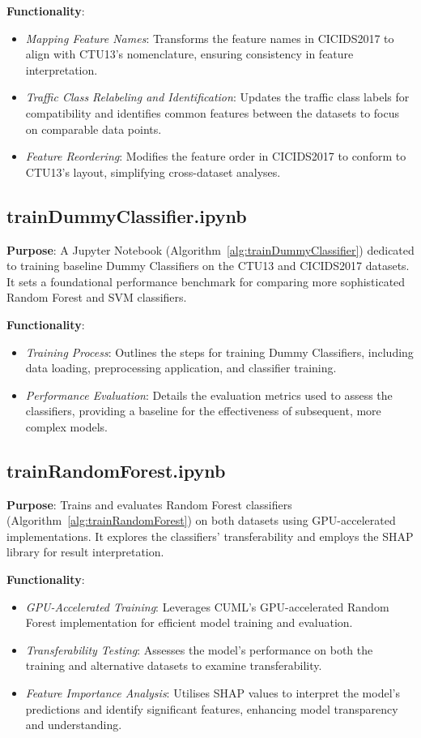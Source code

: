 \textbf{Functionality}:
\begin{itemize}
    \item \textit{Mapping Feature Names}: Transforms the feature names in CICIDS2017 to align with CTU13's nomenclature, ensuring consistency in feature interpretation.
    \item \textit{Traffic Class Relabeling and Identification}: Updates the traffic class labels for compatibility and identifies common features between the datasets to focus on comparable data points.
    \item \textit{Feature Reordering}: Modifies the feature order in CICIDS2017 to conform to CTU13's layout, simplifying cross-dataset analyses.
\end{itemize}

\subsection{trainDummyClassifier.ipynb}
\textbf{Purpose}: A Jupyter Notebook (Algorithm~\ref{alg:trainDummyClassifier}) dedicated to training baseline Dummy Classifiers on the CTU13 and CICIDS2017 datasets. It sets a foundational performance benchmark for comparing more sophisticated Random Forest and SVM classifiers.

\textbf{Functionality}:
\begin{itemize}
    \item \textit{Training Process}: Outlines the steps for training Dummy Classifiers, including data loading, preprocessing application, and classifier training.
    \item \textit{Performance Evaluation}: Details the evaluation metrics used to assess the classifiers, providing a baseline for the effectiveness of subsequent, more complex models.
\end{itemize}

\subsection{trainRandomForest.ipynb}
\textbf{Purpose}: Trains and evaluates Random Forest classifiers (Algorithm~\ref{alg:trainRandomForest}) on both datasets using GPU-accelerated implementations. It explores the classifiers' transferability and employs the SHAP library for result interpretation.

\textbf{Functionality}:
\begin{itemize}
    \item \textit{GPU-Accelerated Training}: Leverages CUML's GPU-accelerated Random Forest implementation for efficient model training and evaluation.
    \item \textit{Transferability Testing}: Assesses the model's performance on both the training and alternative datasets to examine transferability.
    \item \textit{Feature Importance Analysis}: Utilises SHAP values to interpret the model's predictions and identify significant features, enhancing model transparency and understanding.
\end{itemize}

